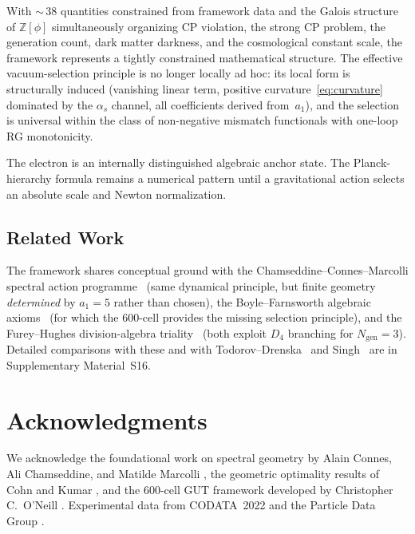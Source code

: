 \documentclass[12pt,a4paper]{article}
\theoremstyle{definition}
\begin{document}
With ${\sim}\,38$ quantities constrained from framework data and the Galois structure of $\mathbb{Z}[\phi]$ simultaneously organizing CP violation, the strong CP problem, the generation count, dark matter darkness, and the cosmological constant scale, the framework represents a tightly constrained mathematical structure.  The effective vacuum-selection principle is no longer locally ad hoc: its local form is structurally induced (vanishing linear term, positive curvature~\eqref{eq:curvature} dominated by the $\alpha_s$ channel, all coefficients derived from~$a_1$), and the selection is universal within the class of non-negative mismatch functionals with one-loop RG monotonicity.

The electron is an internally distinguished algebraic anchor state.  The
Planck-hierarchy formula remains a numerical pattern until a gravitational
action selects an absolute scale and Newton normalization.

\subsection{Related Work}

The framework shares conceptual ground with the Chamseddine--Connes--Marcolli spectral action programme~\cite{chamseddine1997,ccm2007} (same dynamical principle, but finite geometry \emph{determined} by $a_1 = 5$ rather than chosen), the Boyle--Farnsworth algebraic axioms~\cite{boyle2020} (for which the 600-cell provides the missing selection principle), and the Furey--Hughes division-algebra triality~\cite{furey2024} (both exploit $D_4$ branching for $N_{\text{gen}} = 3$).  Detailed comparisons with these and with Todorov--Drenska~\cite{todorov2020} and Singh~\cite{singh2025} are in Supplementary Material~S16.

\section*{Acknowledgments}

We acknowledge the foundational work on spectral geometry by Alain Connes, Ali Chamseddine, and Matilde Marcolli \cite{chamseddine1997,ccm2007}, the geometric optimality results of Cohn and Kumar \cite{cohn2007,cohn2011}, and the 600-cell GUT framework developed by Christopher C.\ O'Neill \cite{oneill2025gut,oneill2023binary}. Experimental data from CODATA~2022 \cite{codata2022} and the Particle Data Group \cite{pdg2024}.
\end{document}
